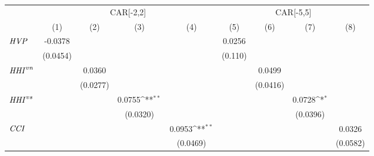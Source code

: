 {
\def\sym#1{\ifmmode^{#1}\else\(^{#1}\)\fi}
\begin{tabular}{l*{8}{c}}
\toprule
                    &\multicolumn{4}{c}{CAR[-2,2]}                                                          &\multicolumn{4}{c}{CAR[-5,5]}                                                          \\\cmidrule(lr){2-5}\cmidrule(lr){6-9}
                    &\multicolumn{1}{c}{(1)}         &\multicolumn{1}{c}{(2)}         &\multicolumn{1}{c}{(3)}         &\multicolumn{1}{c}{(4)}         &\multicolumn{1}{c}{(5)}         &\multicolumn{1}{c}{(6)}         &\multicolumn{1}{c}{(7)}         &\multicolumn{1}{c}{(8)}         \\
\midrule
${\it HVP}$         &     -0.0378         &                     &                     &                     &      0.0256         &                     &                     &                     \\
                    &    (0.0454)         &                     &                     &                     &     (0.110)         &                     &                     &                     \\
${\it HHI}^{vn}$    &                     &      0.0360         &                     &                     &                     &      0.0499         &                     &                     \\
                    &                     &    (0.0277)         &                     &                     &                     &    (0.0416)         &                     &                     \\
${\it HHI}^{vs}$    &                     &                     &      0.0755\sym{**} &                     &                     &                     &      0.0728\sym{*}  &                     \\
                    &                     &                     &    (0.0320)         &                     &                     &                     &    (0.0396)         &                     \\
${\it CCI}$         &                     &                     &                     &      0.0953\sym{**} &                     &                     &                     &      0.0326         \\
                    &                     &                     &                     &    (0.0469)         &                     &                     &                     &    (0.0582)         \\

\end{tabular}}
